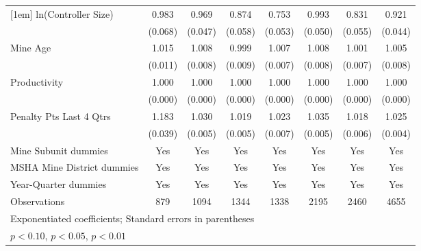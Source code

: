 {\begin{tabular}{l*{7}{c}}
[1em]
ln(Controller Size)      &       0.983         &       0.969         &       0.874\sym{**} &       0.753\sym{***}&       0.993         &       0.831\sym{***}&       0.921\sym{*}  \\
                         &     (0.068)         &     (0.047)         &     (0.058)         &     (0.053)         &     (0.050)         &     (0.055)         &     (0.044)         \\
[1em]
Mine Age                 &       1.015         &       1.008         &       0.999         &       1.007         &       1.008         &       1.001         &       1.005         \\
                         &     (0.011)         &     (0.008)         &     (0.009)         &     (0.007)         &     (0.008)         &     (0.007)         &     (0.008)         \\
[1em]
Productivity             &       1.000         &       1.000         &       1.000         &       1.000         &       1.000         &       1.000         &       1.000         \\
                         &     (0.000)         &     (0.000)         &     (0.000)         &     (0.000)         &     (0.000)         &     (0.000)         &     (0.000)         \\
[1em]
Penalty Pts Last 4 Qtrs  &       1.183\sym{***}&       1.030\sym{***}&       1.019\sym{***}&       1.023\sym{***}&       1.035\sym{***}&       1.018\sym{***}&       1.025\sym{***}\\
                         &     (0.039)         &     (0.005)         &     (0.005)         &     (0.007)         &     (0.005)         &     (0.006)         &     (0.004)         \\
[1em]
Mine Subunit dummies     &         Yes         &         Yes         &         Yes         &         Yes         &         Yes         &         Yes         &         Yes         \\
[1em]
MSHA Mine District dummies&         Yes         &         Yes         &         Yes         &         Yes         &         Yes         &         Yes         &         Yes         \\
[1em]
Year-Quarter dummies     &         Yes         &         Yes         &         Yes         &         Yes         &         Yes         &         Yes         &         Yes         \\
\hline
Observations             &         879         &        1094         &        1344         &        1338         &        2195         &        2460         &        4655         \\
\hline\hline
\multicolumn{8}{l}{\footnotesize Exponentiated coefficients; Standard errors in parentheses}\\
\multicolumn{8}{l}{\footnotesize \sym{*} \(p<0.10\), \sym{**} \(p<0.05\), \sym{***} \(p<0.01\)}\\
\end{tabular}
}
